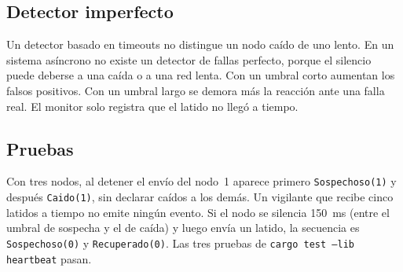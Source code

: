 \subsection{Detector imperfecto}

Un detector basado en timeouts no distingue un nodo caído de uno lento.
En un sistema asíncrono no existe un detector de fallas perfecto, porque
el silencio puede deberse a una caída o a una red lenta. Con un umbral
corto aumentan los falsos positivos. Con un umbral largo se demora más
la reacción ante una falla real. El monitor solo registra que el latido no llegó a tiempo.

\subsection{Pruebas}

Con tres nodos, al detener el envío del nodo~1 aparece primero
\texttt{Sospechoso(1)} y después \texttt{Caido(1)}, sin declarar caídos
a los demás. Un vigilante que recibe cinco latidos a tiempo no emite
ningún evento. Si el nodo se silencia 150~ms (entre el umbral de sospecha
y el de caída) y luego envía un latido, la secuencia es
\texttt{Sospechoso(0)} y \texttt{Recuperado(0)}. Las tres pruebas de
\texttt{cargo test --lib heartbeat} pasan.
